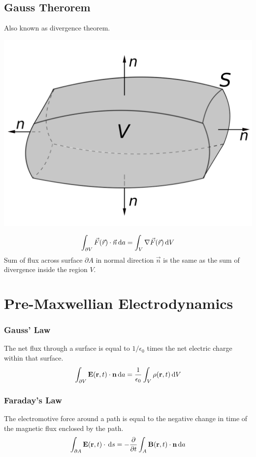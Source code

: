 \documentclass[a4paper, fontsize=8pt, landscape, DIV=1]{scrartcl}
\begin{document}
\begin{multicols*}{4}
    

    \subsection{Gauss Therorem}
    Also known as divergence theorem.
    \begin{center}\includegraphics[width=0.5\columnwidth,keepaspectratio]{img/gaussthm.png}\end{center}
    \[ \int_{\partial V} \vec{F}(\vec{r})\cdot\vec{n}\,\mathrm{d} a = \int_V \nabla\vec{F}(\vec{r})\,\mathrm{d} V \]
    Sum of flux across surface $\partial A$ in normal direction $\vec{n}$ is the same as the sum of divergence inside the region $V$.

  \section{Pre-Maxwellian Electrodynamics}
  \subsubsection{Gauss' Law}
  The net flux through a surface is equal to $1/\epsilon_0$ times the net electric charge within that surface.
  \[\int_{\partial V}\mathbf{E}(\mathbf{r},t)\cdot \mathbf{n} \,\mathrm{d} a = \frac{1}{\epsilon_0}\int_V\rho(\mathbf{r},t)\,\mathrm{d} V \]

  \subsubsection{Faraday's Law}
  The electromotive force around a path is equal to the negative change in time of the magnetic flux enclosed by the path.
  \[\int_{\partial A}\mathbf{E}(\mathbf{r},t)\cdot \,\mathrm{d} s = -\frac{\partial}{\partial t}\int_A \mathbf{B}(\mathbf{r},t)\cdot \mathbf{n} \,\mathrm{d} a \]


\end{multicols*}
\end{document}
